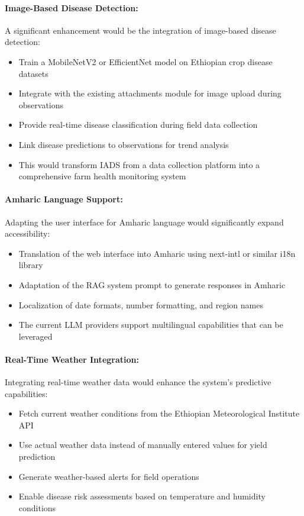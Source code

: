 \paragraph{Image-Based Disease Detection:}
A significant enhancement would be the integration of image-based disease detection:
\begin{itemize}
  \item Train a MobileNetV2 or EfficientNet model on Ethiopian crop disease datasets
  \item Integrate with the existing attachments module for image upload during observations
  \item Provide real-time disease classification during field data collection
  \item Link disease predictions to observations for trend analysis
  \item This would transform IADS from a data collection platform into a comprehensive farm health monitoring system
\end{itemize}

\paragraph{Amharic Language Support:}
Adapting the user interface for Amharic language would significantly expand accessibility:
\begin{itemize}
  \item Translation of the web interface into Amharic using next-intl or similar i18n library
  \item Adaptation of the RAG system prompt to generate responses in Amharic
  \item Localization of date formats, number formatting, and region names
  \item The current LLM providers support multilingual capabilities that can be leveraged
\end{itemize}

\paragraph{Real-Time Weather Integration:}
Integrating real-time weather data would enhance the system's predictive capabilities:
\begin{itemize}
  \item Fetch current weather conditions from the Ethiopian Meteorological Institute API
  \item Use actual weather data instead of manually entered values for yield prediction
  \item Generate weather-based alerts for field operations
  \item Enable disease risk assessments based on temperature and humidity conditions
\end{itemize}


